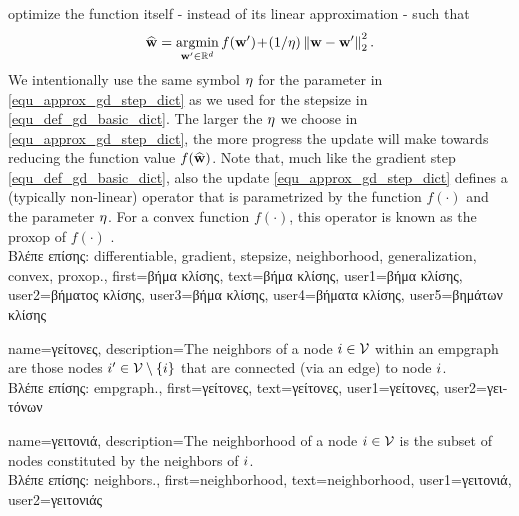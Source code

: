 {{		optimize the function itself - instead of its linear approximation - such that
		\begin{align} 
		\label{equ_approx_gd_step_dict}
		\widehat{{\bf w}} = \operatorname*{argmin}_{{\bf w}' \in \mathbb{R}^{d}} f({\bf w}')\!+\!(1/\eta)\left\Vert {{\bf w}-{\bf w}'} \right\Vert_{2}^2. 
		\end{align}
		We intentionally use the same symbol $\eta$ for the parameter in \eqref{equ_approx_gd_step_dict} 
		as we used for the \gls{stepsize} in \eqref{equ_def_gd_basic_dict}. The larger the $\eta$ we choose in 
		\eqref{equ_approx_gd_step_dict}, the more progress the update will make towards reducing the 
		function value $f(\widehat{{\bf w}})$. Note that, much like the \gls{gradient} step \eqref{equ_def_gd_basic_dict}, 
		also the update \eqref{equ_approx_gd_step_dict} defines a (typically non-linear) operator 
		that is parametrized by the function $f(\cdot)$ and the parameter $\eta$. For a \gls{convex} function 
		$f(\cdot)$, this operator is known as the \gls{proxop} of $f(\cdot)$ \cite{ProximalMethods}.\\ 
		\foreignlanguage{greek}{Βλέπε επίσης:} \gls{differentiable}, \gls{gradient}, \gls{stepsize}, \gls{neighborhood}, \gls{generalization}, \gls{convex}, \gls{proxop}.},
		first={\foreignlanguage{greek}{βήμα κλίσης}},
		text={\foreignlanguage{greek}{βήμα κλίσης}},
		user1={\foreignlanguage{greek}{βήμα κλίσης}}, %
		user2={\foreignlanguage{greek}{βήματος κλίσης}}, %
		user3={\foreignlanguage{greek}{βήμα κλίσης}}, %
		user4={\foreignlanguage{greek}{βήματα κλίσης}}, %
		user5={\foreignlanguage{greek}{βημάτων κλίσης}} %
}

{name={\foreignlanguage{greek}{γείτονες}},
	description={The neighbors of a node $i \in \mathcal{V}$ 
		within an \gls{empgraph} are those nodes $i' \in \mathcal{V} \setminus \{ i\}$ that are connected (via an edge) to node $i$.\\
	\foreignlanguage{greek}{Βλέπε επίσης:} \gls{empgraph}.},
	first={\foreignlanguage{greek}{γείτονες}},
	text={\foreignlanguage{greek}{γείτονες}},
	user1={\foreignlanguage{greek}{γείτονες}}, %
   	user2={\foreignlanguage{greek}{γειτόνων}} %
}

{name={\foreignlanguage{greek}{γειτονιά}},
	description={The neighborhood of a node $i \in \mathcal{V}$ is 
		the subset of nodes constituted by the \gls{neighbors} of $i$.\\
	\foreignlanguage{greek}{Βλέπε επίσης:} \gls{neighbors}.},
	first={neighborhood},
	text={neighborhood},
	user1={\foreignlanguage{greek}{γειτονιά}}, %
   	user2={\foreignlanguage{greek}{γειτονιάς}} %
}

